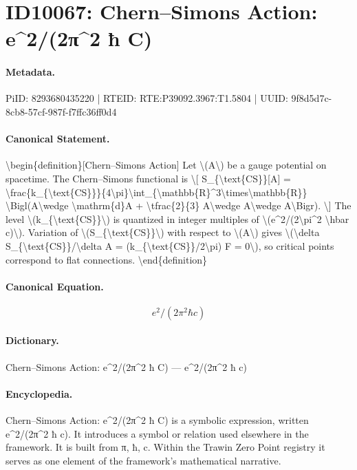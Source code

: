 \section*{ID10067: Chern–Simons Action: e\textasciicircum{}2/(2π\textasciicircum{}2 ħ C)}
\paragraph{Metadata.}
PiID: 8293680435220 | RTEID: RTE:P39092.3967:T1.5804 | UUID: 9f8d5d7c-8cb8-57cf-987f-f7ffc36ff0d4

\paragraph{Canonical Statement.}
\textbackslash{}begin\{definition\}[Chern–Simons Action] Let \textbackslash{}(A\textbackslash{}) be a gauge potential on spacetime. The Chern–Simons functional is \textbackslash{}[ S\_\{\textbackslash{}text\{CS\}\}[A] = \textbackslash{}frac\{k\_\{\textbackslash{}text\{CS\}\}\}\{4\textbackslash{}pi\}\textbackslash{}int\_\{\textbackslash{}mathbb\{R\}\textasciicircum{}3\textbackslash{}times\textbackslash{}mathbb\{R\}\} \textbackslash{}Bigl(A\textbackslash{}wedge \textbackslash{}mathrm\{d\}A + \textbackslash{}tfrac\{2\}\{3\} A\textbackslash{}wedge A\textbackslash{}wedge A\textbackslash{}Bigr). \textbackslash{}] The level \textbackslash{}(k\_\{\textbackslash{}text\{CS\}\}\textbackslash{}) is quantized in integer multiples of \textbackslash{}(e\textasciicircum{}2/(2\textbackslash{}pi\textasciicircum{}2 \textbackslash{}hbar c)\textbackslash{}). Variation of \textbackslash{}(S\_\{\textbackslash{}text\{CS\}\}\textbackslash{}) with respect to \textbackslash{}(A\textbackslash{}) gives \textbackslash{}(\textbackslash{}delta S\_\{\textbackslash{}text\{CS\}\}/\textbackslash{}delta A = (k\_\{\textbackslash{}text\{CS\}\}/2\textbackslash{}pi) F = 0\textbackslash{}), so critical points correspond to flat connections. \textbackslash{}end\{definition\}

\paragraph{Canonical Equation.}
\[
e^2/(2\pi^2 \hbar c)
\]

\paragraph{Dictionary.}
Chern–Simons Action: e\textasciicircum{}2/(2π\textasciicircum{}2 ħ C) — e\textasciicircum{}2/(2π\textasciicircum{}2 ħ c)

\paragraph{Encyclopedia.}
Chern–Simons Action: e\textasciicircum{}2/(2π\textasciicircum{}2 ħ C) is a symbolic expression, written e\textasciicircum{}2/(2π\textasciicircum{}2 ħ c). It introduces a symbol or relation used elsewhere in the framework. It is built from π, ħ, c. Within the Trawin Zero Point registry it serves as one element of the framework's mathematical narrative.
